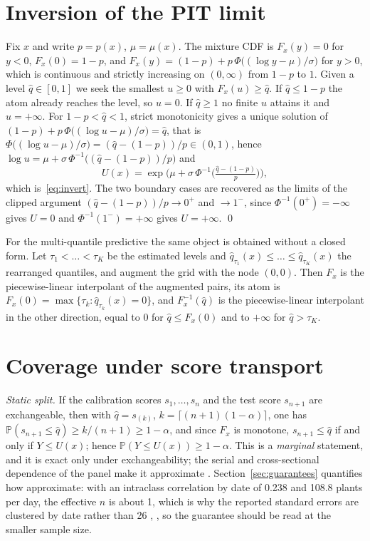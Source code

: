 \documentclass[preprint,3p,times]{elsarticle}
\providecommand{\DIFaddtex}[1]{{\protect\color{blue} \sf #1}} %
\providecommand{\DIFdeltex}[1]{{\protect\color{red} \scriptsize #1}} %
\providecommand{\DIFaddbegin}{} %
\providecommand{\DIFaddend}{} %
\providecommand{\DIFdelbegin}{} %
\providecommand{\DIFdelend}{} %
\providecommand{\DIFadd}[1]{\texorpdfstring{\DIFaddtex{#1}}{#1}} %
\providecommand{\DIFdel}[1]{\texorpdfstring{\DIFdeltex{#1}}{}} %
\begin{document}
\appendix

\section{Inversion of the PIT limit}
\label{app:inversion}

Fix $x$ and write $p=p(x)$, $\mu=\mu(x)$. The mixture CDF is $F_x(y)=0$ for $y<0$, $F_x(0)=1-p$, and $F_x(y)=(1-p)+p\,\Phi\big((\log y-\mu)/\sigma\big)$ for $y>0$, which is continuous and strictly increasing on $(0,\infty)$ from $1-p$ to $1$. Given a level $\hat q\in[0,1]$ we seek the smallest $u\ge 0$ with $F_x(u)\ge \hat q$. If $\hat q\le 1-p$ the atom already reaches the level, so $u=0$. If $\hat q\ge 1$ no finite $u$ attains it and $u=+\infty$. For $1-p<\hat q<1$, strict monotonicity gives a unique solution of $(1-p)+p\,\Phi\big((\log u-\mu)/\sigma\big)=\hat q$, that is $\Phi\big((\log u-\mu)/\sigma\big)=(\hat q-(1-p))/p\in(0,1)$, hence $\log u=\mu+\sigma\,\Phi^{-1}\big((\hat q-(1-p))/p\big)$ and
\[
U(x)=\exp\!\Big(\mu+\sigma\,\Phi^{-1}\big(\tfrac{\hat q-(1-p)}{p}\big)\Big),
\]
which is~\eqref{eq:invert}. The two boundary cases are recovered as the limits of the clipped argument $(\hat q-(1-p))/p\to 0^+$ and $\to 1^-$, since $\Phi^{-1}(0^+)=-\infty$ gives $U=0$ and $\Phi^{-1}(1^-)=+\infty$ gives $U=+\infty$. \qed

\DIFaddbegin \DIFadd{For the multi-quantile predictive the same object is obtained without a closed form. Let $\tau_1<\dots<\tau_K$ be the estimated levels and $\hat q_{\tau_1}(x)\le\dots\le\hat q_{\tau_K}(x)$ the rearranged quantiles, and augment the grid with the node $(0,0)$. Then $F_x$ is the piecewise-linear interpolant of the augmented pairs, its atom is $F_x(0)=\max\{\tau_k:\hat q_{\tau_k}(x)=0\}$, and $F_x^{-1}(\hat q)$ is the piecewise-linear interpolant in the other direction, equal to $0$ for $\hat q\le F_x(0)$ and to $+\infty$ for $\hat q>\tau_K$.
}

\DIFaddend \section{Coverage under score transport}
\label{app:coverage}

\emph{Static split.} If the calibration scores $s_1,\dots,s_n$ and the test score $s_{n+1}$ are exchangeable, then with $\hat q=s_{(k)}$, $k=\lceil(n+1)(1-\alpha)\rceil$, one has $\mathbb{P}(s_{n+1}\le\hat q)\ge k/(n+1)\ge 1-\alpha$, and since $F_x$ is monotone, $s_{n+1}\le\hat q$ if and only if $Y\le U(x)$; hence $\mathbb{P}(Y\le U(x))\ge 1-\alpha$. This is a \emph{marginal} statement, and it is exact only under exchangeability; the serial and cross-sectional dependence of the panel make it approximate\DIFaddbegin \DIFadd{. Section~\ref{sec:guarantees} quantifies how approximate: with an intraclass correlation by date of 0.238 and 108.8 plants per day, the effective $n$ is about 1}{\DIFaddend ,\DIFdelbegin \DIFdel{which is why the reported standard errors are clustered by date}\DIFdelend \DIFaddbegin }\DIFadd{000 rather than 26}{\DIFadd{,}}\DIFadd{552, so the guarantee should be read at the smaller sample size}\DIFaddend .
\end{document}
